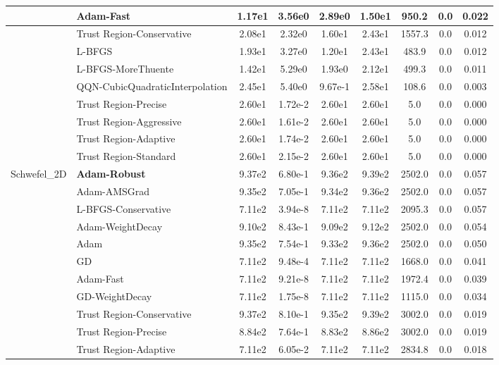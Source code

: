 \documentclass[10pt]{article}
\begin{document}
\begin{longtable}{|l|l|c|c|c|c|c|c|c|}
\hline
 & Adam-Fast & 1.17e1 & 3.56e0 & 2.89e0 & 1.50e1 & 950.2 & 0.0 & 0.022 \\
\hline
 & Trust Region-Conservative & 2.08e1 & 2.32e0 & 1.60e1 & 2.43e1 & 1557.3 & 0.0 & 0.012 \\
\hline
 & L-BFGS & 1.93e1 & 3.27e0 & 1.20e1 & 2.43e1 & 483.9 & 0.0 & 0.012 \\
\hline
 & L-BFGS-MoreThuente & 1.42e1 & 5.29e0 & 1.93e0 & 2.12e1 & 499.3 & 0.0 & 0.011 \\
\hline
 & QQN-CubicQuadraticInterpolation & 2.45e1 & 5.40e0 & 9.67e-1 & 2.58e1 & 108.6 & 0.0 & 0.003 \\
\hline
 & Trust Region-Precise & 2.60e1 & 1.72e-2 & 2.60e1 & 2.60e1 & 5.0 & 0.0 & 0.000 \\
\hline
 & Trust Region-Aggressive & 2.60e1 & 1.61e-2 & 2.60e1 & 2.60e1 & 5.0 & 0.0 & 0.000 \\
\hline
 & Trust Region-Adaptive & 2.60e1 & 1.74e-2 & 2.60e1 & 2.60e1 & 5.0 & 0.0 & 0.000 \\
\hline
 & Trust Region-Standard & 2.60e1 & 2.15e-2 & 2.60e1 & 2.60e1 & 5.0 & 0.0 & 0.000 \\
Schwefel\_2D & \textbf{Adam-Robust} & 9.37e2 & 6.80e-1 & 9.36e2 & 9.39e2 & 2502.0 & 0.0 & 0.057 \\
\hline
 & Adam-AMSGrad & 9.35e2 & 7.05e-1 & 9.34e2 & 9.36e2 & 2502.0 & 0.0 & 0.057 \\
\hline
 & L-BFGS-Conservative & 7.11e2 & 3.94e-8 & 7.11e2 & 7.11e2 & 2095.3 & 0.0 & 0.057 \\
\hline
 & Adam-WeightDecay & 9.10e2 & 8.43e-1 & 9.09e2 & 9.12e2 & 2502.0 & 0.0 & 0.054 \\
\hline
 & Adam & 9.35e2 & 7.54e-1 & 9.33e2 & 9.36e2 & 2502.0 & 0.0 & 0.050 \\
\hline
 & GD & 7.11e2 & 9.48e-4 & 7.11e2 & 7.11e2 & 1668.0 & 0.0 & 0.041 \\
\hline
 & Adam-Fast & 7.11e2 & 9.21e-8 & 7.11e2 & 7.11e2 & 1972.4 & 0.0 & 0.039 \\
\hline
 & GD-WeightDecay & 7.11e2 & 1.75e-8 & 7.11e2 & 7.11e2 & 1115.0 & 0.0 & 0.034 \\
\hline
 & Trust Region-Conservative & 9.37e2 & 8.10e-1 & 9.35e2 & 9.39e2 & 3002.0 & 0.0 & 0.019 \\
\hline
 & Trust Region-Precise & 8.84e2 & 7.64e-1 & 8.83e2 & 8.86e2 & 3002.0 & 0.0 & 0.019 \\
\hline
 & Trust Region-Adaptive & 7.11e2 & 6.05e-2 & 7.11e2 & 7.11e2 & 2834.8 & 0.0 & 0.018 \\

\end{longtable}
\end{document}
